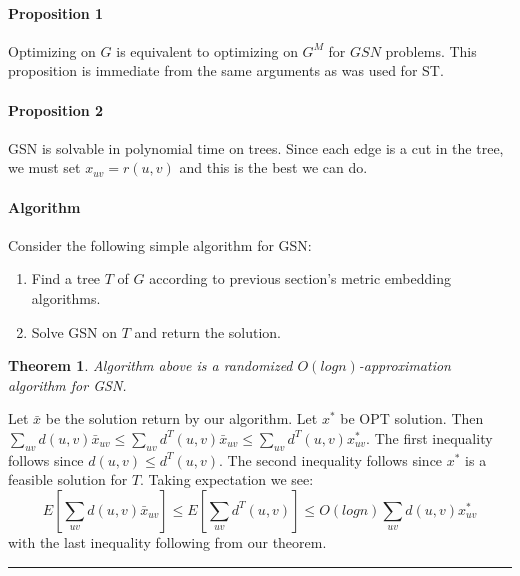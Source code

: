 \documentclass[letterpaper,12pt,oneside,onecolumn]{article}
\newenvironment{proof}{{\bf Proof:  }}{\hfill\rule{2mm}{2mm}}
\newtheorem{theorem}[fact]{Theorem}
\begin{document}
\paragraph{Proposition 1} Optimizing on $G$ is equivalent to optimizing on $G^M$ for $GSN$ problems. This proposition is immediate from the same arguments as was used for ST.
\paragraph{Proposition 2} GSN is solvable in polynomial time on trees. Since each edge is a cut in the tree, we must set $x_{uv} = r(u,v)$ and this is the best we can do.
\paragraph{Algorithm} Consider the following simple algorithm for GSN:
\begin{enumerate}
\item Find a tree $T$ of $G$ according to previous section's metric embedding algorithms.
\item Solve GSN on $T$ and return the solution.
\end{enumerate}
\begin{theorem}
Algorithm above is a randomized $O(log n)$-approximation algorithm for GSN.
\end{theorem}
\begin{proof}
Let $\bar{x}$ be the solution return by our algorithm. Let $x^*$ be OPT solution. Then $\sum_{uv} d(u,v) \bar{x}_{uv} \leq \sum_{uv} d^T(u,v)\bar{x}_{uv} \leq \sum_{uv} d^T(u,v) x^*_{uv}$. The first inequality follows since $d(u,v) \leq d^T(u,v)$. The second inequality follows since $x^*$ is a feasible solution for $T$. Taking expectation we see:
$$E[\sum_{uv} d(u,v) \bar{x}_{uv}] \leq E[\sum_{uv} d^T(u,v)] \leq O(log n) \sum_{uv} d(u,v) x^*_{uv}$$
with the last inequality following from our theorem.
\end{proof}
\end{document}
